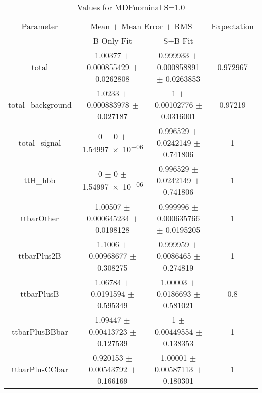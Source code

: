 \begin{table}
\centering
\caption{Values for MDFnominal S=1.0}
\begin{tabular}{cccc}
\toprule
Parameter & \multicolumn{2}{c}{Mean $\pm$ Mean Error $\pm$ RMS} & Expectation\\
 & B-Only Fit & S+B Fit & \\
\midrule
total & \num{1.00377} $\pm$ \num{0.000855429} $\pm$ \num{0.0262808} & \num{0.999933} $\pm$ \num{0.000858891} $\pm$ \num{0.0263853} & \num{0.972967}\\
total\_background & \num{1.0233} $\pm$ \num{0.000883978} $\pm$ \num{0.027187} & \num{1} $\pm$ \num{0.00102776} $\pm$ \num{0.0316001} & \num{0.97219}\\
total\_signal & \num{0} $\pm$ \num{0} $\pm$ \num{1.54997e-06} & \num{0.996529} $\pm$ \num{0.0242149} $\pm$ \num{0.741806} & \num{1}\\
ttH\_hbb & \num{0} $\pm$ \num{0} $\pm$ \num{1.54997e-06} & \num{0.996529} $\pm$ \num{0.0242149} $\pm$ \num{0.741806} & \num{1}\\
ttbarOther & \num{1.00507} $\pm$ \num{0.000645234} $\pm$ \num{0.0198128} & \num{0.999996} $\pm$ \num{0.000635766} $\pm$ \num{0.0195205} & \num{1}\\
ttbarPlus2B & \num{1.1006} $\pm$ \num{0.00968677} $\pm$ \num{0.308275} & \num{0.999959} $\pm$ \num{0.0086465} $\pm$ \num{0.274819} & \num{1}\\
ttbarPlusB & \num{1.06784} $\pm$ \num{0.0191594} $\pm$ \num{0.595349} & \num{1.00003} $\pm$ \num{0.0186693} $\pm$ \num{0.581021} & \num{0.8}\\
ttbarPlusBBbar & \num{1.09447} $\pm$ \num{0.00413723} $\pm$ \num{0.127539} & \num{1} $\pm$ \num{0.00449554} $\pm$ \num{0.138353} & \num{1}\\
ttbarPlusCCbar & \num{0.920153} $\pm$ \num{0.00543792} $\pm$ \num{0.166169} & \num{1.00001} $\pm$ \num{0.00587113} $\pm$ \num{0.180301} & \num{1}\\
\bottomrule
\end{tabular}
\end{table}